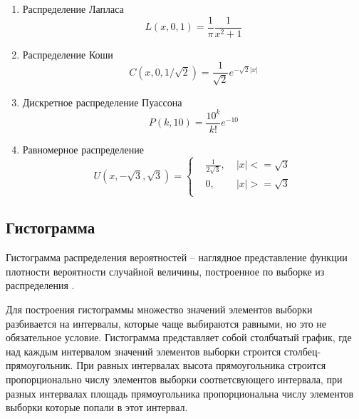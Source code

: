 \documentclass[12pt]{article}
\begin{document}
\begin{flushleft}
\begin{enumerate}
            \item Распределение Лапласа
            \begin{equation}
                L(x, 0, 1) = \frac{1}{\pi}\frac{1}{x^2 + 1}
                \label{laplace}
            \end{equation}

            \item Распределение Коши
            \begin{equation}
                C(x, 0, 1/\sqrt{2}) =\frac{1}{\sqrt{2}} e^{-\sqrt{2}|x|}
                \label{cauchy}
            \end{equation}

            \item Дискретное распределение Пуассона
            \begin{equation}
                P(k, 10) = \frac{10^k}{k!} e^{-10}
                \label{poisson}
            \end{equation}

            \item Равномерное распределение
            \begin{equation}
                U(x, -\sqrt{3}, \sqrt{3}) = 
                \left\{
                \begin{aligned}
                    & \frac{1}{2\sqrt{3}},& \; |x| <= \sqrt{3}\\
                    & 0,                  & \; |x| >= \sqrt{3}\\
                \end{aligned}
                \right.
                \label{uniform}
            \end{equation}
        \end{enumerate}

    \subsection{Гистограмма}

        Гистограмма распределения вероятностей -- наглядное представление функции плотности вероятности случайной величины, построенное по выборке из распределения \cite{histogram}.

        Для построения гистограммы множество значений элементов выборки разбивается на интервалы, которые чаще выбираются равными, но это не обязательное условие. Гистограмма представляет собой столбчатый график, где над каждым интервалом значений элементов выборки строится столбец-прямоугольник.  При равных интервалах высота прямоугольника строится пропорционально числу элементов выборки соответсвующего интервала, при разных интервалах площадь прямоугольника пропорциональна числу элементов выборки которые попали в этот интервал.


\end{flushleft}
\end{document}
